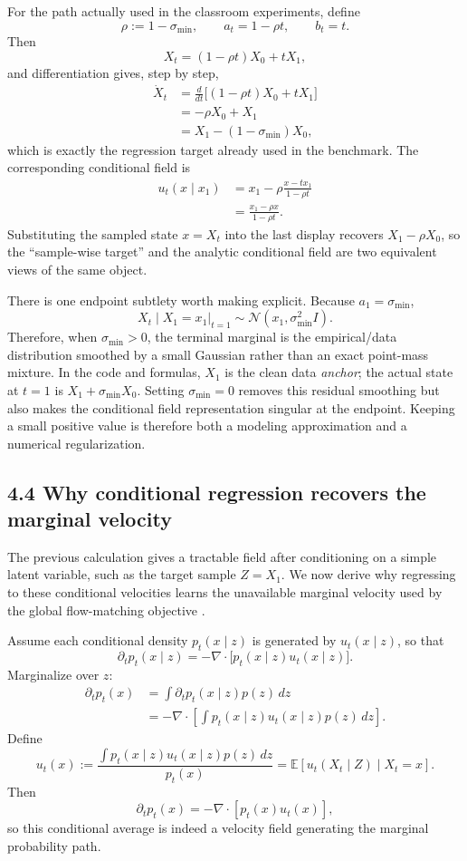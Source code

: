 \documentclass[11pt]{article}
\newcommand{\E}{\mathbb{E}}
\begin{document}
For the path actually used in the classroom experiments, define
\[
 \rho:=1-\sigma_{\min},\qquad
 a_t=1-\rho t,\qquad b_t=t.
\]
Then
\[
 X_t=(1-\rho t)X_0+tX_1,
\]
and differentiation gives, step by step,
\begin{align*}
 \dot X_t
 &=\frac{d}{dt}\big[(1-\rho t)X_0+tX_1\big]\\
 &=-\rho X_0+X_1\\
 &=X_1-(1-\sigma_{\min})X_0,
\end{align*}
which is exactly the regression target already used in the benchmark. The
corresponding conditional field is
\begin{align*}
 u_t(x\mid x_1)
 &=x_1-\rho\frac{x-tx_1}{1-\rho t}\\
 &=\frac{x_1-\rho x}{1-\rho t}.
\end{align*}
Substituting the sampled state $x=X_t$ into the last display recovers
$X_1-\rho X_0$, so the ``sample-wise target'' and the analytic conditional
field are two equivalent views of the same object.

There is one endpoint subtlety worth making explicit. Because
$a_1=\sigma_{\min}$,
\[
 X_t\mid X_1=x_1\Big|_{t=1}
 \sim\mathcal N(x_1,\sigma_{\min}^2I).
\]
Therefore, when $\sigma_{\min}>0$, the terminal marginal is the empirical/data
distribution smoothed by a small Gaussian rather than an exact point-mass
mixture. In the code and formulas, $X_1$ is the clean data \emph{anchor}; the
actual state at $t=1$ is $X_1+\sigma_{\min}X_0$. Setting
$\sigma_{\min}=0$ removes this residual smoothing but also makes the
conditional field representation singular at the endpoint. Keeping a small
positive value is therefore both a modeling approximation and a numerical
regularization.

\subsection*{4.4 Why conditional regression recovers the marginal velocity}

The previous calculation gives a tractable field after conditioning on a
simple latent variable, such as the target sample $Z=X_1$. We now derive why
regressing to these conditional velocities learns the unavailable marginal
velocity used by the global flow-matching objective \cite{lipman2024guide,lipman2023flow}.

Assume each conditional density $p_t(x\mid z)$ is generated by
$u_t(x\mid z)$, so that
\[
 \partial_t p_t(x\mid z)
 =-\nabla\!\cdot\big[p_t(x\mid z)u_t(x\mid z)\big].
\]
Marginalize over $z$:
\begin{align*}
 \partial_t p_t(x)
 &=\int \partial_t p_t(x\mid z)p(z)\,dz\\
 &=-\nabla\!\cdot
 \left[\int p_t(x\mid z)u_t(x\mid z)p(z)\,dz\right].
\end{align*}
Define
\[
 u_t(x)
 :=\frac{\int p_t(x\mid z)u_t(x\mid z)p(z)\,dz}{p_t(x)}
 =\E\!\left[u_t(X_t\mid Z)\mid X_t=x\right].
\]
Then
\[
 \partial_t p_t(x)=-\nabla\!\cdot[p_t(x)u_t(x)],
\]
so this conditional average is indeed a velocity field generating the marginal
probability path.
\end{document}
